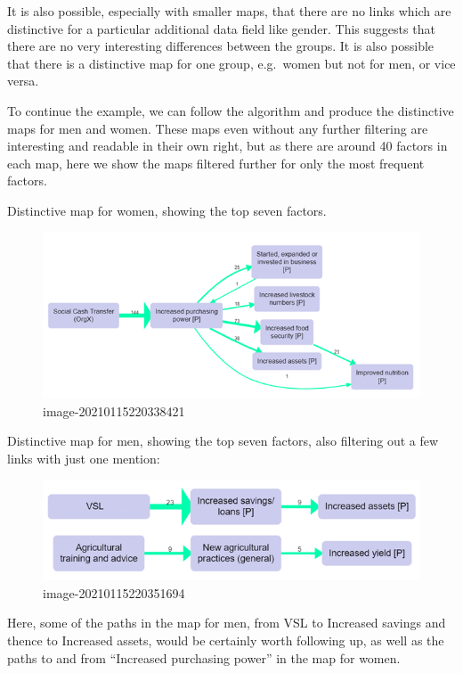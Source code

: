 \documentclass[
]{book}
\begin{document}
It is also possible, especially with smaller maps, that there are no links which are distinctive for a particular additional data field like gender. This suggests that there are no very interesting differences between the groups. It is also possible that there is a distinctive map for one group, e.g.~women but not for men, or vice versa.

To continue the example, we can follow the algorithm and produce the distinctive maps for men and women. These maps even without any further filtering are interesting and readable in their own right, but as there are around 40 factors in each map, here we show the maps filtered further for only the most frequent factors.

Distinctive map for women, showing the top seven factors.

\begin{figure}
\centering
\includegraphics{_assets/image-20210115220338421.png}
\caption{image-20210115220338421}
\end{figure}

Distinctive map for men, showing the top seven factors, also filtering out a few links with just one mention:

\begin{figure}
\centering
\includegraphics{_assets/image-20210115220351694.png}
\caption{image-20210115220351694}
\end{figure}

Here, some of the paths in the map for men, from VSL to Increased savings and thence to Increased assets, would be certainly worth following up, as well as the paths to and from ``Increased purchasing power'' in the map for women.
\end{document}
